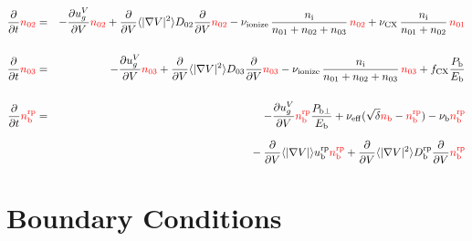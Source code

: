 \documentclass[11pt]{article}
\def\r#1{{\rm#1}}
\def\aves#1{\langle#1\rangle}
\def\dd#1#2{\frac{\partial #1}{\partial #2}}
\def\ddV{\frac{\partial}{\partial V}}
\def\ni{n_\r{i}}
\def\nb{n_\r{b}}
\def\nna{n_{01}}
\def\nnb{n_{02}}
\def\nnc{n_{03}}
\def\Pb{P_\r{b}}
\def\Eb{E_\r{b}}
\def\ugV{u_{g}^V}
\def\ddt{\frac{\partial}{\partial t}}
\def\nbrp{n_\r{b}^\r{rp}}
\def\Pbperp{P_{\r{b}\perp}}
\def\nueff{\nu_\r{eff}}
\def\ubrp{u_\r{b}^\r{rp}}
\def\Dbrp{D_\r{b}^\r{rp}}
\def\fCX{f_\r{CX}}
\def\nuCX{\nu_\r{CX}}
\def\nuion{\nu_\r{ionize}}
\def\nub{\nu_\r{b}}
\def\red#1{\textcolor{red}{#1}}
\begin{document}
\begin{eqnarray}
  \ddt \red{\nnb} &=& 
%
  - \dd{\ugV}{V} \red{\nnb}
%
  + \ddV \aves{|\nabla V|^2} D_{02} \ddV \red{\nnb}
%
  - \nuion\, \frac{\ni}{\nna + \nnb + \nnc}\, \red{\nnb}
%
  + \nuCX\, \frac{\ni}{\nna + \nnb}\, \red{\nna}
%
\\[5mm]
  \ddt \red{\nnc} &=& 
%
  - \dd{\ugV}{V} \red{\nnc}
%
  + \ddV \aves{|\nabla V|^2} D_{03} \ddV \red{\nnc}
%
  - \nuion\, \frac{\ni}{\nna + \nnb + \nnc}\, \red{\nnc}
%
  + \fCX \frac{\Pb}{\Eb}
\\[5mm]
  \ddt \red{\nbrp} &=&
%
  - \dd{\ugV}{V} \red{\nbrp}
%
    \frac{\Pbperp}{\Eb}
%
  + \nueff (\sqrt{\delta} \red{\nb} - \red{\nbrp})
%
  - \nub \red{\nbrp}
%
\nonumber\\[2.5mm]&&{}
  - \ddV \aves{|\nabla V|} \ubrp \red{\nbrp} 
  + \ddV \aves{|\nabla V|^2} \Dbrp \ddV \red{\nbrp}
\end{eqnarray}

\bigskip

\section{Boundary Conditions}
\end{document}
